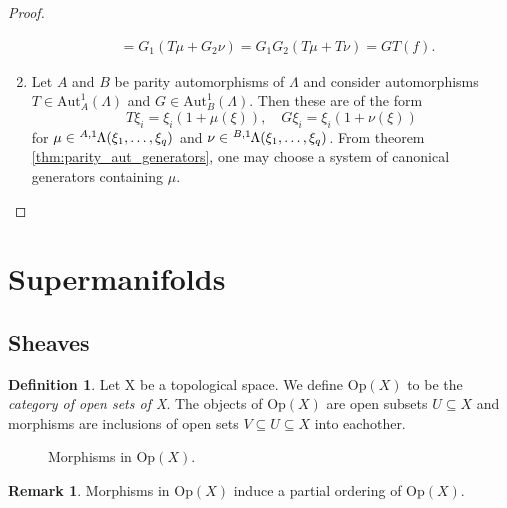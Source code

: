 \documentclass{article}
\theoremstyle{definition}
\newtheorem{definition}{Definition}
\newtheorem*{remark}{Remark}
\begin{document}
\begin{proof}
\begin{enumerate}
\begin{align*}
            &= G_1 (T \mu + G_2 \nu) = G_1 G_2 (T\mu + T \nu) = G T (f).
        \end{align*}
        \item Let $A$ and $B$ be parity automorphisms of $\Lambda$ and consider automorphisms $T \in \text{Aut}_A^1(\Lambda)$ and $G \in \text{Aut}_B^1(\Lambda)$. Then these are of the form
        \begin{equation*}
            T \xi_i = \xi_i (1 + \mu(\xi)), \quad G \xi_i = \xi_i (1 + \nu(\xi))
        \end{equation*}
        for $\mu \in \tensor[^{A, 1}]{\Lambda(\xi_1, \dots, \xi_q)}{}$ and $\nu \in \tensor[^{B, 1}]{\Lambda(\xi_1, \dots, \xi_q)}{}$. From theorem \ref{thm:parity_aut_generators}, one may choose a system of canonical generators containing $\mu$.
    \end{enumerate}
\end{proof}






\newpage

\section{Supermanifolds}

\subsection{Sheaves}

\begin{definition}
    Let X be a topological space. We define Op$(X)$ to be the \emph{category of open sets of X}. The objects of Op$(X)$ are open subsets $U \subseteq X$ and morphisms are inclusions of open sets $V \subseteq U \subseteq X$ into eachother.

    \begin{figure}[ht]
        \centering
        \caption{Morphisms in Op$(X)$.}
    \end{figure}
\end{definition}

\begin{remark}
    Morphisms in Op$(X)$ induce a partial ordering of Op$(X)$.
\end{remark}
\end{document}
